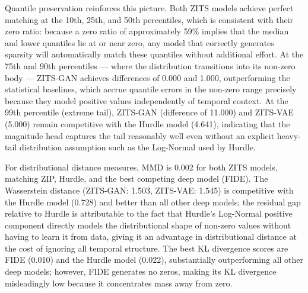 \documentclass[make,article,submit,moreauthors]{Definitions/mdpi}
\begin{document}
Quantile preservation reinforces this picture. Both ZITS models achieve perfect matching at the 10th, 25th, and 50th percentiles, which is consistent with their zero ratio: because a zero ratio of approximately 59\% implies that the median and lower quantiles lie at or near zero, any model that correctly generates sparsity will automatically match these quantiles without additional effort. At the 75th and 90th percentiles — where the distribution transitions into its non-zero body — ZITS-GAN achieves differences of 0.000 and 1.000, outperforming the statistical baselines, which accrue quantile errors in the non-zero range precisely because they model positive values independently of temporal context. At the 99th percentile (extreme tail), ZITS-GAN (difference of 11.000) and ZITS-VAE (5.000) remain competitive with the Hurdle model (4.641), indicating that the magnitude head captures the tail reasonably well even without an explicit heavy-tail distribution assumption such as the Log-Normal used by Hurdle.

For distributional distance measures, MMD is 0.002 for both ZITS models, matching ZIP, Hurdle, and the best competing deep model (FIDE). The Wasserstein distance (ZITS-GAN: 1.503, ZITS-VAE: 1.545) is competitive with the Hurdle model (0.728) and better than all other deep models; the residual gap relative to Hurdle is attributable to the fact that Hurdle's Log-Normal positive component directly models the distributional shape of non-zero values without having to learn it from data, giving it an advantage in distributional distance at the cost of ignoring all temporal structure. The best KL divergence scores are FIDE (0.010) and the Hurdle model (0.022), substantially outperforming all other deep models; however, FIDE generates no zeros, making its KL divergence misleadingly low because it concentrates mass away from zero.
\end{document}
